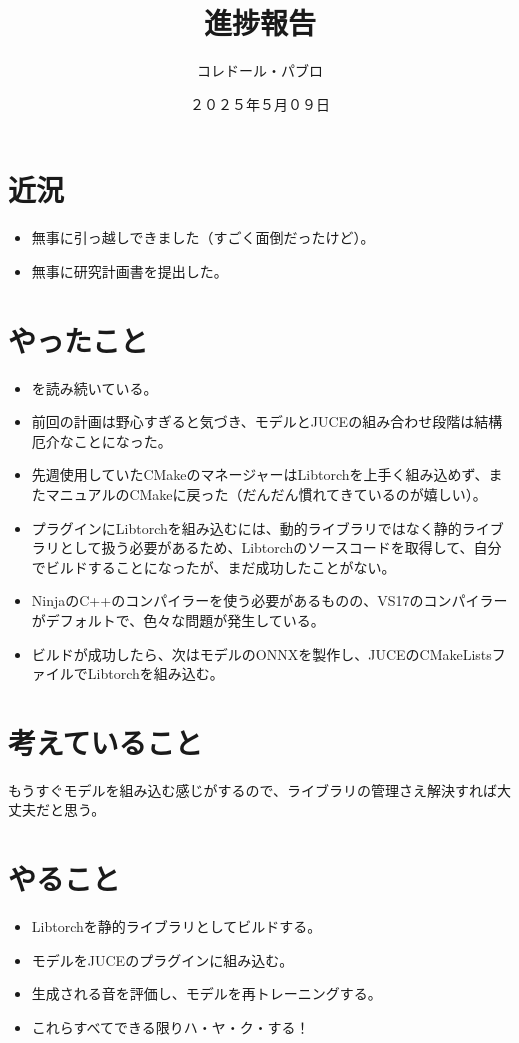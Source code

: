 \documentclass[a4paper, 12pt]{article}
\title{進捗報告}
\author{コレドール・パブロ}
\date{２０２５年５月０９日}
\begin{document}
\maketitle

\section*{近況}
\begin{itemize}
    \item 無事に引っ越しできました（すごく面倒だったけど）。
    \item 無事に研究計画書を提出した。
\end{itemize} 

\section*{やったこと}
\begin{itemize}
    \item \cite{Latent_Timbre}を読み続いている。
    \item 前回の計画は野心すぎると気づき、モデルとJUCEの組み合わせ段階は結構厄介なことになった。
    \item 先週使用していたCMakeのマネージャーはLibtorchを上手く組み込めず、またマニュアルのCMakeに戻った（だんだん慣れてきているのが嬉しい）。
    \item プラグインにLibtorchを組み込むには、動的ライブラリではなく静的ライブラリとして扱う必要があるため、Libtorchのソースコードを取得して、自分でビルドすることになったが、まだ成功したことがない。
    \item NinjaのC++のコンパイラーを使う必要があるものの、VS17のコンパイラーがデフォルトで、色々な問題が発生している。
    \item ビルドが成功したら、次はモデルのONNXを製作し、JUCEのCMakeListsファイルでLibtorchを組み込む。
\end{itemize}

\section*{考えていること}

もうすぐモデルを組み込む感じがするので、ライブラリの管理さえ解決すれば大丈夫だと思う。


\section*{やること}
\begin{itemize}
    \item Libtorchを静的ライブラリとしてビルドする。
    \item モデルをJUCEのプラグインに組み込む。
    \item 生成される音を評価し、モデルを再トレーニングする。
    \item これらすべてできる限りハ・ヤ・ク・する！
\end{itemize}

\section{}



\end{document}
